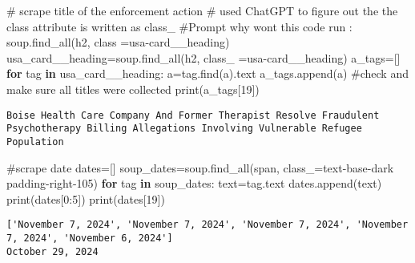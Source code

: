 \documentclass[
  letterpaper,
  DIV=11,
  numbers=noendperiod]{scrartcl}
\newenvironment{Shaded}{\begin{snugshade}}{\end{snugshade}}
\newcommand{\BuiltInTok}[1]{\textcolor[rgb]{0.00,0.23,0.31}{#1}}
\newcommand{\CommentTok}[1]{\textcolor[rgb]{0.37,0.37,0.37}{#1}}
\newcommand{\ControlFlowTok}[1]{\textcolor[rgb]{0.00,0.23,0.31}{\textbf{#1}}}
\newcommand{\DecValTok}[1]{\textcolor[rgb]{0.68,0.00,0.00}{#1}}
\newcommand{\KeywordTok}[1]{\textcolor[rgb]{0.00,0.23,0.31}{\textbf{#1}}}
\newcommand{\NormalTok}[1]{\textcolor[rgb]{0.00,0.23,0.31}{#1}}
\newcommand{\OperatorTok}[1]{\textcolor[rgb]{0.37,0.37,0.37}{#1}}
\newcommand{\StringTok}[1]{\textcolor[rgb]{0.13,0.47,0.30}{#1}}
\begin{document}
\begin{Shaded}
\begin{Highlighting}[]
\CommentTok{\# scrape title of the enforcement action }
\CommentTok{\# used ChatGPT to figure out the the class attribute is written as class\_}
\CommentTok{\#Prompt why won\textquotesingle{}t this code run : soup.find\_all(\textquotesingle{}h2\textquotesingle{}, class =\textquotesingle{}usa{-}card\_\_heading\textquotesingle{})}
\NormalTok{usa\_card\_\_heading}\OperatorTok{=}\NormalTok{soup.find\_all(}\StringTok{\textquotesingle{}h2\textquotesingle{}}\NormalTok{, class\_ }\OperatorTok{=}\StringTok{\textquotesingle{}usa{-}card\_\_heading\textquotesingle{}}\NormalTok{)}
\NormalTok{a\_tags}\OperatorTok{=}\NormalTok{[]}
\ControlFlowTok{for}\NormalTok{ tag }\KeywordTok{in}\NormalTok{ usa\_card\_\_heading:}
\NormalTok{  a}\OperatorTok{=}\NormalTok{tag.find(}\StringTok{\textquotesingle{}a\textquotesingle{}}\NormalTok{).text}
\NormalTok{  a\_tags.append(a)}
\CommentTok{\#check and make sure all titles were collected}
\BuiltInTok{print}\NormalTok{(a\_tags[}\DecValTok{19}\NormalTok{]) }
\end{Highlighting}
\end{Shaded}

\begin{verbatim}
Boise Health Care Company And Former Therapist Resolve Fraudulent Psychotherapy Billing Allegations Involving Vulnerable Refugee Population
\end{verbatim}

\begin{Shaded}
\begin{Highlighting}[]
\CommentTok{\#scrape date}
\NormalTok{dates}\OperatorTok{=}\NormalTok{[]}
\NormalTok{soup\_dates}\OperatorTok{=}\NormalTok{soup.find\_all(}\StringTok{\textquotesingle{}span\textquotesingle{}}\NormalTok{, class\_}\OperatorTok{=}\StringTok{\textquotesingle{}text{-}base{-}dark padding{-}right{-}105\textquotesingle{}}\NormalTok{)}
\ControlFlowTok{for}\NormalTok{ tag }\KeywordTok{in}\NormalTok{ soup\_dates:}
\NormalTok{  text}\OperatorTok{=}\NormalTok{tag.text}
\NormalTok{  dates.append(text)}
\BuiltInTok{print}\NormalTok{(dates[}\DecValTok{0}\NormalTok{:}\DecValTok{5}\NormalTok{])}
\BuiltInTok{print}\NormalTok{(dates[}\DecValTok{19}\NormalTok{])}
\end{Highlighting}
\end{Shaded}

\begin{verbatim}
['November 7, 2024', 'November 7, 2024', 'November 7, 2024', 'November 7, 2024', 'November 6, 2024']
October 29, 2024
\end{verbatim}
\end{document}
